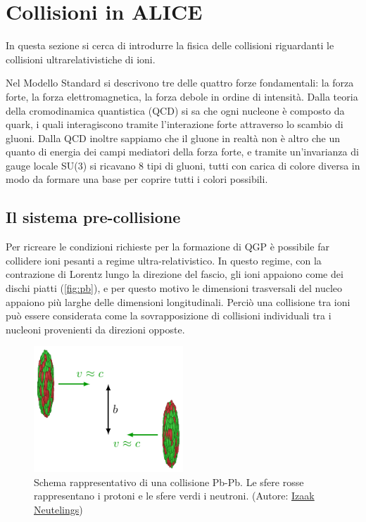 \section{Collisioni in ALICE}
In questa sezione si cerca di introdurre la fisica delle collisioni riguardanti le collisioni ultrarelativistiche di ioni.

Nel Modello Standard si descrivono tre delle quattro forze fondamentali: la forza forte, la forza elettromagnetica, la forza debole in ordine di intensità.
Dalla teoria della cromodinamica quantistica (QCD) si sa che ogni nucleone è composto da quark, i quali interagiscono tramite l'interazione forte attraverso lo scambio di gluoni.
Dalla QCD inoltre sappiamo che il gluone in realtà non è altro che un quanto di energia dei campi mediatori della forza forte, e tramite un'invarianza di gauge locale SU(3) si ricavano 8 tipi di gluoni, tutti con carica di colore diversa in modo da formare una base per coprire tutti i colori possibili.\\

\subsection{Il sistema pre-collisione}
Per ricreare le condizioni richieste per la formazione di QGP è possibile far collidere ioni pesanti a regime ultra-relativistico.
In questo regime, con la contrazione di Lorentz lungo la direzione del fascio, gli ioni appaiono come dei dischi piatti (\autoref{fig:pb}), e per questo motivo le dimensioni trasversali del nucleo appaiono più larghe delle dimensioni longitudinali. 
Perciò una collisione tra ioni può essere considerata come la sovrapposizione di collisioni individuali tra i nucleoni provenienti da direzioni opposte.
\begin{figure}[htb]
    \centering
    \includegraphics[width=0.5\textwidth]{image/1-alice/PbPb_collisions.pdf}
    \caption{Schema rappresentativo di una collisione Pb-Pb. Le sfere rosse rappresentano i protoni e le sfere verdi i neutroni. (Autore: \href{https://tikz.net/pbpb_collisions/}{Izaak Neutelings})}
    \label{fig:pb}
\end{figure}

